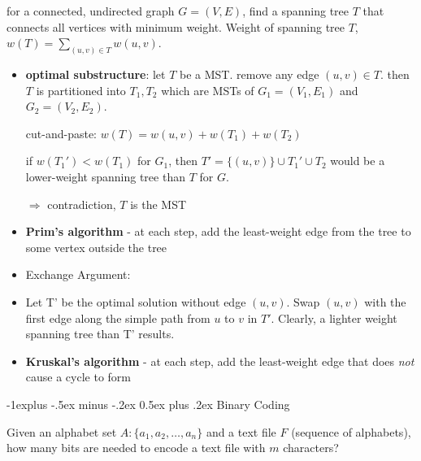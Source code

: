 \documentclass[10pt, landscape]{article}
\makeatletter
\renewcommand{\subsection}{\@startsection{subsection}{2}{0mm}%
  {-1explus -.5ex minus -.2ex}%
  {0.5ex plus .2ex}%
{\normalfont\normalsize\bfseries}}
\makeatother
\begin{document}
\begin{multicols*}{4}
  for a connected, undirected graph $G = (V, E)$, find a spanning tree $T$ that connects all vertices with minimum weight. Weight of spanning tree $T$, $w(T) = \sum\limits_{(u, v) \in T} w(u, v)$.

  \begin{itemize}
    \item \textbf{optimal substructure}: let $T$ be a MST. remove any edge $(u, v) \in T$. then $T$ is partitioned into $T_1, T_2$ which are MSTs of  $G_1 = (V_1, E_1)$ and $G_2 = (V_2, E_2)$.
      \begin{niceproof}
        cut-and-paste: $w(T) = w(u, v) + w(T_1) + w(T_2)$

        if $w(T_1') < w(T_1)$ for $G_1$, then $T' = \{(u, v)\} \cup T_1' \cup T_2$ would be a lower-weight spanning tree than $T$ for $G$. 

        $\Rightarrow$ contradiction, $T$ is the MST
      \end{niceproof}
    \item \textbf{Prim's algorithm} - at each step, add the least-weight edge from the tree to some vertex outside the tree
    \item Exchange Argument: 
    \item \begin{niceproof}
      Let T' be the optimal solution without edge $(u, v)$.
      Swap $(u, v)$ with the first edge along the simple path from $u$ to $v$ in $T'$.
      Clearly, a lighter weight spanning tree than T' results.
    \end{niceproof}
    \item \textbf{Kruskal's algorithm} - at each step, add the least-weight edge that does \textit{not} cause a cycle to form
  \end{itemize}

  \subsection{Binary Coding}

  Given an alphabet set $A: \{ a_1, a_2, \dots, a_n \}$ and a text file $F$ (sequence of alphabets), 
  how many bits are needed to encode a text file with $m$ characters?


\end{multicols*}
\end{document}
